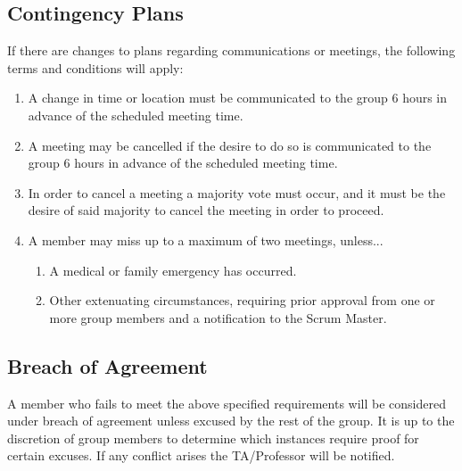 \documentclass{article}
\begin{document}
    \subsection{Contingency Plans}
        If there are changes to plans regarding communications or meetings, the following terms and conditions will apply:
        \begin{enumerate}
            \item A change in time or location must be communicated to the group 6 hours in advance of the scheduled meeting time.
            \item A meeting may be cancelled if the desire to do so is communicated to the group 6 hours in advance of the scheduled meeting time.
            \item In order to cancel a meeting a majority vote must occur, and it must be the desire of said majority to cancel the meeting in order to proceed.
            \item A member may miss up to a maximum of two meetings, unless...
                \begin{enumerate}
                    \item A medical or family emergency has occurred.
                    \item Other extenuating circumstances, requiring prior approval from one or more group members and a notification to the Scrum Master.
                \end{enumerate}
        \end{enumerate}
    \subsection{Breach of Agreement}
        A member who fails to meet the above specified requirements will be considered under breach of agreement unless excused by the rest of the group. It is up to the discretion of group members to determine which instances require proof for certain excuses. If any conflict arises the TA/Professor will be notified.
        
\end{document}
